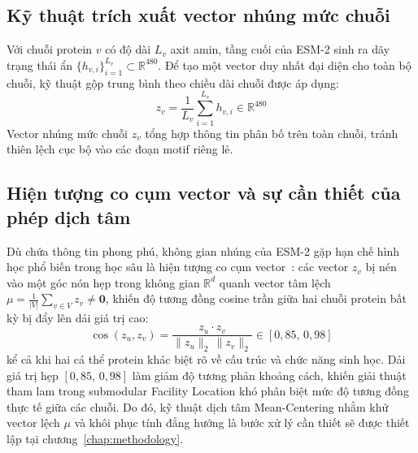 \subsection{Kỹ thuật trích xuất vector nhúng mức chuỗi}
\label{subsec:mean_pooling}

Với chuỗi protein $v$ có độ dài $L_v$ axit amin, tầng cuối của ESM-2 sinh ra dãy trạng thái ẩn $\{h_{v, i}\}_{i=1}^{L_v} \subset \mathbb{R}^{480}$. Để tạo một vector duy nhất đại diện cho toàn bộ chuỗi, kỹ thuật gộp trung bình theo chiều dài chuỗi được áp dụng:
\begin{equation}
\label{eq:mean_pooling}
z_v = \frac{1}{L_v} \sum_{i=1}^{L_v} h_{v, i} \in \mathbb{R}^{480}
\end{equation}
Vector nhúng mức chuỗi $z_v$ tổng hợp thông tin phân bố trên toàn chuỗi, tránh thiên lệch cục bộ vào các đoạn motif riêng lẻ.

\subsection{Hiện tượng co cụm vector và sự cần thiết của phép dịch tâm}
\label{subsec:representation_anisotropy}

Dù chứa thông tin phong phú, không gian nhúng của ESM-2 gặp hạn chế hình học phổ biến trong học sâu là hiện tượng co cụm vector~\cite{ethayarajh2019}: các vector $z_v$ bị nén vào một góc nón hẹp trong không gian $\mathbb{R}^d$ quanh vector tâm lệch $\mu = \frac{1}{|V|} \sum_{v \in V} z_v \neq \mathbf{0}$, khiến độ tương đồng cosine trần giữa hai chuỗi protein bất kỳ bị đẩy lên dải giá trị cao:
\begin{equation}
\label{eq:anisotropy_cosine}
\cos(z_u, z_v) = \frac{z_u \cdot z_v}{\|z_u\|_2 \, \|z_v\|_2} \in [0{,}85, \, 0{,}98]
\end{equation}
kể cả khi hai cá thể protein khác biệt rõ về cấu trúc và chức năng sinh học. Dải giá trị hẹp $[0{,}85, \, 0{,}98]$ làm giảm độ tương phản khoảng cách, khiến giải thuật tham lam trong submodular Facility Location khó phân biệt mức độ tương đồng thực tế giữa các chuỗi. Do đó, kỹ thuật dịch tâm Mean-Centering nhằm khử vector lệch $\mu$ và khôi phục tính đẳng hướng là bước xử lý cần thiết sẽ được thiết lập tại chương~\ref{chap:methodology}.

